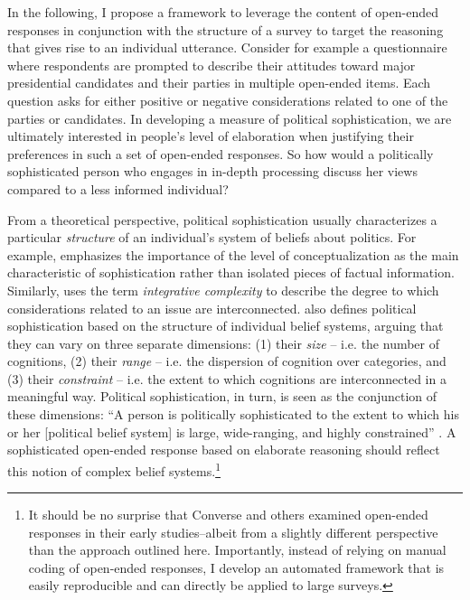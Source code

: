 In the following, I propose a framework to leverage the content of open-ended responses in conjunction with the structure of a survey to target the reasoning that gives rise to an individual utterance. Consider for example a questionnaire where respondents are prompted to describe their attitudes toward major presidential candidates and their parties in multiple open-ended items. Each question asks for either positive or negative considerations related to one of the parties or candidates. In developing a measure of political sophistication, we are ultimately interested in people's level of elaboration when justifying their preferences in such a set of open-ended responses. So how would a politically sophisticated person who engages in in-depth processing discuss her views compared to a less informed individual?

From a theoretical perspective, political sophistication usually characterizes a particular \textit{structure} of an individual's system of beliefs about politics. For example, \citet{converse1964nature} emphasizes the importance of the level of conceptualization as the main characteristic of sophistication rather than isolated pieces of factual information. Similarly, \citet{tetlock1983cognitive,tetlock1993cognitive} uses the term \textsl{integrative complexity} to describe the degree to which considerations related to an issue are interconnected. \citet{luskin1987measuring} also defines political sophistication based on the structure of individual belief systems, arguing that they can vary on three separate dimensions: (1) their \textsl{size} -- i.e. the number of cognitions, (2) their \textsl{range} -- i.e. the dispersion of cognition over categories, and (3) their \textsl{constraint} -- i.e. the extent to which cognitions are interconnected in a meaningful way. Political sophistication, in turn, is seen as the conjunction of these dimensions: ``A person is politically sophisticated to the extent to which his or her [political belief system] is large, wide-ranging, and highly constrained'' \citep[860]{luskin1987measuring}. A sophisticated open-ended response based on elaborate reasoning should reflect this notion of complex belief systems.\footnote{It should be no surprise that Converse and others examined open-ended responses in their early studies--albeit from a slightly different perspective than the approach outlined here. Importantly, instead of relying on manual coding of open-ended responses, I develop an automated framework that is easily reproducible and can directly be applied to large surveys.}

